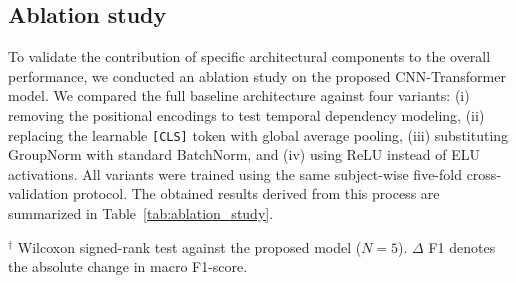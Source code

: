 \documentclass[a4paper,fleqn]{cas-dc}
\begin{document}
\subsection{Ablation study}
\label{subsec:ablation}

To validate the contribution of specific architectural components to the overall performance, we conducted an ablation study on the proposed CNN-Transformer model. We compared the full baseline architecture against four variants: (i) removing the positional encodings to test temporal dependency modeling, (ii) replacing the learnable \texttt{[CLS]} token with global average pooling, (iii) substituting GroupNorm with standard BatchNorm, and (iv) using ReLU instead of ELU activations. All variants were trained using the same subject-wise five-fold cross-validation protocol. The obtained results derived from this process are summarized in Table~\ref{tab:ablation_study}.

\begin{table}[t]
\centering
\caption{Ablation study of architectural components across five folds.}
\label{tab:ablation_study}
\begin{threeparttable}
\footnotesize
{}
\begin{tablenotes}
\begin{minipage}{\columnwidth}
    \item $^{\dagger}$ Wilcoxon signed-rank test against the proposed model ($N=5$). $\Delta$ F1 denotes the absolute change in macro F1-score.
\end{minipage}
\end{tablenotes}
\end{threeparttable}
\vspace{-10pt}
\end{table}
\end{document}
